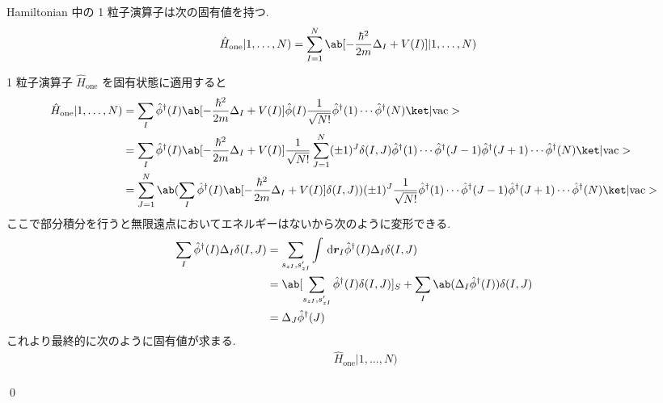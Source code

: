 \documentclass[uplatex,dvipdfmx,a4paper,11pt]{jlreq}
\makeatletter
\newcommand{\rr}{\bm{r}}
\numberwithin{equation}{section}
\theoremstyle{definition}
\renewenvironment{proof}[1][\proofname]{\par
  \normalfont
  \topsep6\p@\@plus6\p@ \trivlist
  \item[\hskip\labelsep{\bfseries #1}\@addpunct{\bfseries}]\ignorespaces\quad\par
}{
  \qed\endtrivlist\@endpefalse
}
\renewcommand\proofname{証明}
\makeatother
\begin{document}
\begin{lemma}
  Hamiltonian 中の 1 粒子演算子は次の固有値を持つ.
  \begin{align}
    \hat{H}_{\mathrm{one}}|1,\ldots,N) & = \sum_{I = 1}^{N}\ab[-\frac{\hbar^2}{2m}\Delta_{I} + V(I)]|1,\ldots,N)
  \end{align}
  \label{Hamiltonian one eigen}
\end{lemma}
\begin{proof}
  1 粒子演算子 $\hat{H}_{\mathrm{one}}$ を固有状態に適用すると
  \begin{align}
    \hat{H}_{\mathrm{one}}|1,\ldots,N) & = \sum_{I}\hat{\phi}^\dagger(I)\ab[-\frac{\hbar^2}{2m}\Delta_I + V(I)]\hat{\phi}(I)\frac{1}{\sqrt{N!}}\hat{\phi}^\dagger(1)\cdots\hat{\phi}^\dagger(N)\ket|\mathrm{vac}>                                                                                    \\
                                       & = \sum_{I}\hat{\phi}^\dagger(I)\ab[-\frac{\hbar^2}{2m}\Delta_I + V(I)]\frac{1}{\sqrt{N!}}\sum_{J = 1}^{N}(\pm 1)^{J}\delta(I, J)\hat{\phi}^\dagger(1)\cdots\hat{\phi}^\dagger(J-1)\hat{\phi}^\dagger(J+1)\cdots\hat{\phi}^\dagger(N)\ket|\mathrm{vac}>      \\
                                       & = \sum_{J = 1}^{N}\ab(\sum_{I}\hat{\phi}^\dagger(I)\ab[-\frac{\hbar^2}{2m}\Delta_I + V(I)]\delta(I, J))(\pm 1)^{J}\frac{1}{\sqrt{N!}}\hat{\phi}^\dagger(1)\cdots\hat{\phi}^\dagger(J-1)\hat{\phi}^\dagger(J+1)\cdots\hat{\phi}^\dagger(N)\ket|\mathrm{vac}>
  \end{align}
  ここで部分積分を行うと無限遠点においてエネルギーはないから次のように変形できる.
  \begin{align}
    \sum_{I}\hat{\phi}^\dagger(I)\Delta_I\delta(I, J) & = \sum_{s_{zI}, s_{zI}'}\int\dl{\rr_I}\hat{\phi}^\dagger(I)\Delta_I\delta(I, J)                                         \\
                                                      & = \ab[\sum_{s_{zI}, s_{zI}'}\hat{\phi}^\dagger(I)\delta(I, J)]_S + \sum_I\ab(\Delta_I\hat{\phi}^\dagger(I))\delta(I, J) \\
                                                      & = \Delta_J\hat{\phi}^\dagger(J)
  \end{align}
  これより最終的に次のように固有値が求まる.
  \begin{align}
     & \quad\ \hat{H}_{\mathrm{one}}|1,\ldots,N)                                                                                                                                                                                                                 \\

\end{align}
\end{proof}
\end{document}
